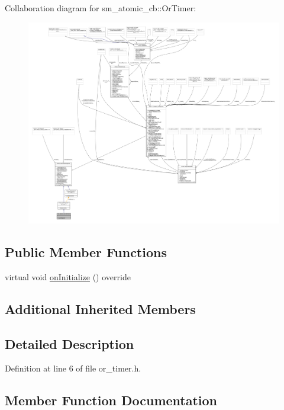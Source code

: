 Collaboration diagram for sm\+\_\+atomic\+\_\+cb\+:\+:Or\+Timer\+:
\nopagebreak
\begin{figure}[H]
\begin{center}
\leavevmode
\includegraphics[width=350pt]{classsm__atomic__cb_1_1OrTimer__coll__graph}
\end{center}
\end{figure}
\subsection*{Public Member Functions}
\begin{DoxyCompactItemize}
\item 
virtual void \hyperlink{classsm__atomic__cb_1_1OrTimer_a0d010997d6304786b2b91ae3f32fa978}{on\+Initialize} () override
\end{DoxyCompactItemize}
\subsection*{Additional Inherited Members}


\subsection{Detailed Description}


Definition at line 6 of file or\+\_\+timer.\+h.



\subsection{Member Function Documentation}
\mbox{\label{classsm__atomic__cb_1_1OrTimer_a0d010997d6304786b2b91ae3f32fa978}} 
